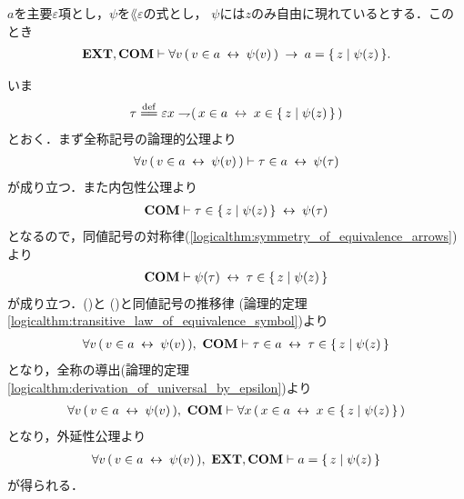 	\begin{screen}
		\begin{thm}
		\label{thm:equivalent_formula_rewriting_2}
			$a$を主要$\varepsilon$項とし，$\psi$を$\lang{\varepsilon}$の式とし，
			$\psi$には$z$のみ自由に現れているとする．このとき
			\begin{align}
				\mbox{{\bf EXT}},\mbox{\bf COM} \vdash \forall v\, (\, v \in a \hspace{0.25em}\leftrightarrow\hspace{0.25em} \psi(v)\, )
				\hspace{0.25em}\rightarrow\hspace{0.25em} a = \{\, z \mid \psi(z)\, \}.
			\end{align}
		\end{thm}
	\end{screen}
	
	\begin{sketch}
		いま
		\begin{align}
			\tau \defeq 
			\varepsilon x \negation (\, x \in a \lrarrow x \in \Set{z}{\psi(z)}\, )
		\end{align}
		とおく．まず全称記号の論理的公理より
		\begin{align}
			\forall v\, (\, v \in a \hspace{0.25em}\leftrightarrow\hspace{0.25em} \psi(v)\, )
			\vdash \tau \in a \hspace{0.25em}\leftrightarrow\hspace{0.25em} \psi(\tau)
			\label{fom:equivalent_formula_rewriting_2_1}
		\end{align}
		が成り立つ．また内包性公理より
		\begin{align}
			\mbox{\bf COM} \vdash \tau \in \{\, z \mid \psi(z)\, \} \hspace{0.25em}\leftrightarrow\hspace{0.25em} \psi(\tau)
		\end{align}
		となるので，同値記号の対称律(\ref{logicalthm:symmetry_of_equivalence_arrows})より
		\begin{align}
			\mbox{\bf COM} \vdash \psi(\tau) \hspace{0.25em}\leftrightarrow\hspace{0.25em} \tau \in \{\, z \mid \psi(z)\, \}
			\label{fom:equivalent_formula_rewriting_2_2}
		\end{align}
		が成り立つ．()と
		()と同値記号の推移律
		(論理的定理\ref{logicalthm:transitive_law_of_equivalence_symbol})より
		\begin{align}
			\forall v\, (\, v \in a \hspace{0.25em}\leftrightarrow\hspace{0.25em} \psi(v)\, ),\ \mbox{\bf COM} \vdash
			\tau \in a \hspace{0.25em}\leftrightarrow\hspace{0.25em} \tau \in \{\, z \mid \psi(z)\, \}
		\end{align}
		となり，全称の導出(論理的定理\ref{logicalthm:derivation_of_universal_by_epsilon})より
		\begin{align}
			\forall v\, (\, v \in a \hspace{0.25em}\leftrightarrow\hspace{0.25em} \psi(v)\, ),\ \mbox{\bf COM} \vdash
			\forall x\, (\, x \in a \hspace{0.25em}\leftrightarrow\hspace{0.25em} x \in \{\, z \mid \psi(z)\, \}\, )
		\end{align}
		となり，外延性公理より
		\begin{align}
			\forall v\, (\, v \in a \hspace{0.25em}\leftrightarrow\hspace{0.25em} \psi(v)\, ),\ \mbox{{\bf EXT}},\mbox{\bf COM} \vdash
			a = \{\, z \mid \psi(z)\, \}
		\end{align}
		が得られる．
		\QED
	\end{sketch}
	
